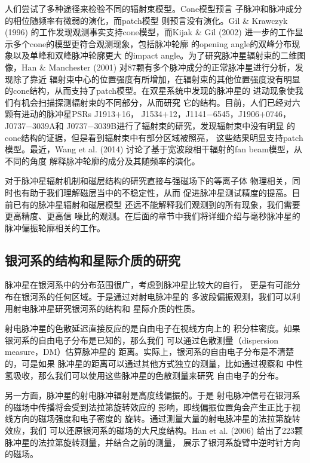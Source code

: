 人们尝试了多种途径来检验不同的辐射束模型。Cone模型预言
子脉冲和脉冲成分的相位随频率有微弱的演化，而patch模型
则预言没有演化\supercite{gk96,kg02}。Gil \& Krawczyk (1996)\supercite{gk96}
的工作发现观测事实支持cone模型，而Kijak \& Gil (2002)\supercite{kg02}
进一步的工作显示多个cone的模型更符合观测现象，包括脉冲轮廓
的opening angle的双峰分布现象以及单峰和双峰脉冲轮廓更大
的impact angle。为了研究脉冲星辐射束的二维图像，Han \& Manchester (2001)\supercite{Han01}
对87颗有多个脉冲成分的正常脉冲星进行分析，发现除了靠近
辐射束中心的位置强度有所增加，在辐射束的其他位置强度没有明显
的cone结构，从而支持了patch模型。在双星系统中发现的脉冲星的
进动现象使我们有机会扫描探测辐射束的不同部分，从而研究
它的结构。目前，人们已经对六颗有进动的脉冲星PSRs J1913$+$16，
J1534$+$12，J1141$-$6545，J1906$+$0746，J0737$-$3039A和
J0737$-$3039B进行了辐射束的研究\supercite{kra12}，发现辐射束中没有明显
的cone结构的证据，但是看到辐射束中有部分区域被照亮，
这些结果明显支持patch模型。最近，Wang et al. (2014)\supercite{Wang14}
讨论了基于宽波段相干辐射的fan beam模型，从不同的角度
解释脉冲轮廓的成分及其随频率的演化。

对于脉冲星辐射机制和磁层结构的研究直接与强磁场下的等离子体
物理相关，同时也有助于我们理解磁层当中的不稳定性，从而
促进脉冲星测试精度的提高。目前已有的脉冲星辐射和磁层模型
还远不能解释我们观测到的所有现象，我们需要更高精度、更高信
噪比的观测。在后面的章节中我们将详细介绍与毫秒脉冲星的
脉冲偏振轮廓相关的工作。

\subsection{银河系的结构和星际介质的研究}

脉冲星在银河系中的分布范围很广，考虑到脉冲星比较大的自行，
更是有可能分布在银河系的任何区域。于是通过对射电脉冲星的
多波段偏振观测，我们可以利用射电脉冲星研究银河系的结构和
星际介质的性质。

射电脉冲星的色散延迟直接反应的是自由电子在视线方向上的
积分柱密度。如果银河系的自由电子分布是已知的，那么我们
可以通过色散测量（dispersion measure，DM）估算脉冲星的
距离。实际上，银河系的自由电子分布是不清楚的，可是如果
脉冲星的距离可以通过其他方式独立的测量，比如通过视察和
中性氢吸收，那么我们可以使用这些脉冲星的色散测量来研究
自由电子的分布\supercite{cordes}。

另一方面，脉冲星的射电脉冲辐射是高度线偏振的。于是
射电脉冲信号在银河系的磁场中传播将会受到法拉第旋转效应的
影响，即线偏振位置角会产生正比于视线方向的磁场强度和电子密度的
旋转。通过测量大量的射电脉冲星的法拉第旋转效应，我们
可以还原银河系的磁场的大尺度结构。Han et al. (2006)\supercite{hml+06}
给出了223颗脉冲星的法拉第旋转测量，并结合之前的测量，
展示了银河系旋臂中逆时针方向的磁场。

